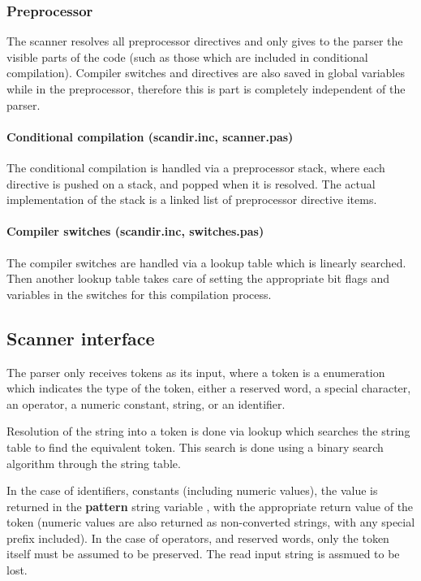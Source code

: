 \documentclass [12pt]{article}
\begin{document}
\subsubsection{Preprocessor}
\label{subsubsec:preprocessorhook}

The scanner resolves all preprocessor directives and only gives to the 
parser the visible parts of the code (such as those which are included in 
conditional compilation). Compiler switches and directives are also saved in 
global variables while in the preprocessor, therefore this is part is 
completely independent of the parser. 

\paragraph{Conditional compilation (scandir.inc, scanner.pas)}

The conditional compilation is handled via a preprocessor stack, where each 
directive is pushed on a stack, and popped when it is resolved. The actual 
implementation of the stack is a linked list of preprocessor directive 
items.

\paragraph{Compiler switches (scandir.inc, switches.pas)}

The compiler switches are handled via a lookup table which is linearly 
searched. Then another lookup table takes care of setting the appropriate 
bit flags and variables in the switches for this compilation process.

\subsection{Scanner interface}
\label{subsec:scanner}

The parser only receives tokens as its input, where a token is a enumeration 
which indicates the type of the token, either a reserved word, a special 
character, an operator, a numeric constant, string, or an identifier.

Resolution of the string into a token is done via lookup which searches the 
string table to find the equivalent token. This search is done using a 
binary search algorithm through the string table.

In the case of identifiers, constants (including numeric values), the value 
is returned in the \textbf{pattern} string variable , with the appropriate 
return value of the token (numeric values are also returned as non-converted 
strings, with any special prefix included). In the case of operators, and 
reserved words, only the token itself must be assumed to be preserved. The 
read input string is assmued to be lost.
\end{document}
